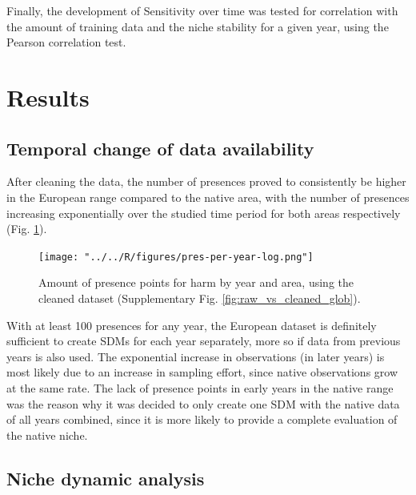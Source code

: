 \documentclass[12pt,a4paper]{article}
\begin{document}
Finally, the development of Sensitivity over time was tested for correlation with the amount of training data and the niche stability for a given year, using the Pearson correlation test.

\newpage
\section{Results} \label{sec:results}

\subsection{Temporal change of data availability} \label{ssec:temp_data_change}
After cleaning the data, the number of presences proved to consistently be higher in the European range compared to the native area, with the number of presences increasing exponentially over the studied time period for both areas respectively (Fig. \ref{fig:pres_per_year_log}).

\begin{figure}[!h]
    \centering
    \texttt{[image: "../../R/figures/pres-per-year-log.png"]}
    \caption{\label{fig:pres_per_year_log} Amount of presence points for \gls{harm} by year and area, using the cleaned dataset (Supplementary Fig. \ref{fig:raw_vs_cleaned_glob}).}
\end{figure}

With at least 100 presences for any year, the European dataset is definitely sufficient to create SDMs for each year separately, more so if data from previous years is also used.
The exponential increase in observations (in later years) is most likely due to an increase in sampling effort, since native observations grow at the same rate.
The lack of presence points in early years in the native range was the reason why it was decided to only create one SDM with the native data of all years combined, since it is more likely to provide a complete evaluation of the native niche.

\subsection{Niche dynamic analysis} \label{ssec:niche_dyn_analysis}
\end{document}
